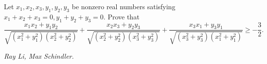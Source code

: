 Let $x_1,x_2,x_3,y_1,y_2,y_3$ be nonzero real numbers satisfying $x_1+x_2+x_3=0, y_1+y_2+y_3=0$. Prove that
\[\frac{x_1x_2+y_1y_2}{\sqrt{(x_1^2+y_1^2)(x_2^2+y_2^2)}}+\frac{x_2x_3+y_2y_3}{\sqrt{(x_2^2+y_2^2)(x_3^2+y_3^2)}}+\frac{x_3x_1+y_3y_1}{\sqrt{(x_3^2+y_3^2)(x_1^2+y_1^2)}} \ge -\frac32.\]

\textit{Ray Li, Max Schindler.}